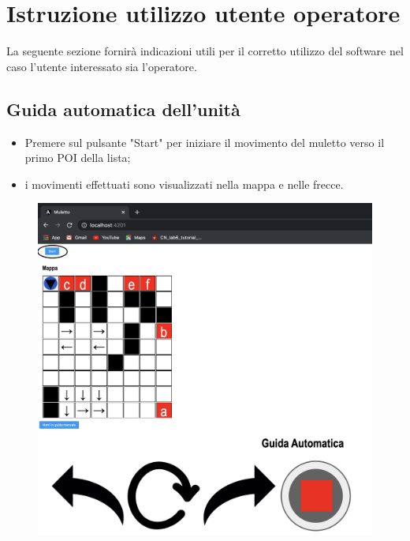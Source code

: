 \section{Istruzione utilizzo utente operatore}

La seguente sezione fornirà indicazioni utili per il corretto utilizzo del software nel caso l'utente interessato sia l'operatore.
\subsection{Guida automatica dell'unità}
\begin{itemize}
    \item Premere sul pulsante "Start" per iniziare il movimento del muletto verso il primo POI della lista;
    \item i movimenti effettuati sono visualizzati nella mappa e nelle frecce.
    
\end{itemize}
\begin{figure}[H]
    \centering
    \includegraphics[scale=0.4]{res/images/forklift_start.png}
\end{figure}

